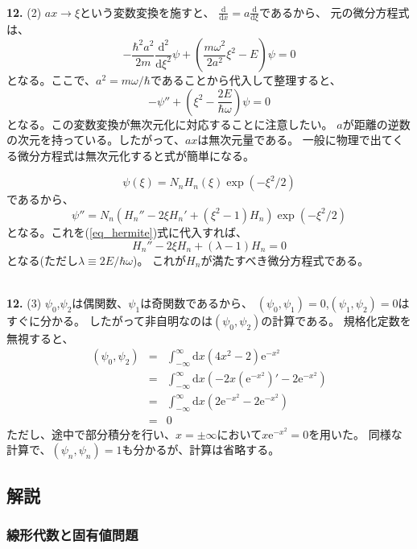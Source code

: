 \documentclass{jarticle}
\newcommand{\diff}{\mathrm d}
\newcommand{\ans}[2]{\noindent\\ {\bf \large #1.} (#2)}
\newcommand{\e}{\mathrm e}
\begin{document}
\ans{12}{2}
$ax \rightarrow \xi$という変数変換を施すと、
$\displaystyle \frac{\diff}{\diff x} = a \displaystyle\frac{\diff}{\diff \xi}$であるから、
元の微分方程式は、
$$
  -\frac{\hbar^2 a^2}{2m} \frac{\diff^2}{\diff \xi^2} \psi +
  \left(
  \frac{m \omega^2}{2a^2} \xi^2 -E
  \right) \psi = 0
$$
となる。ここで、$a^2 = m\omega/\hbar$であることから代入して整理すると、
\begin{equation}
  - \psi'' + (\xi^2 - \frac{2E}{\hbar \omega})\psi = 0 \label{eq_hermite}
\end{equation}
となる。この変数変換が無次元化に対応することに注意したい。
$a$が距離の逆数の次元を持っている。したがって、$ax$は無次元量である。
一般に物理で出てくる微分方程式は無次元化すると式が簡単になる。

$$
  \psi(\xi) = N_n H_n(\xi) \exp(-\xi^2/2)
$$
であるから、
$$
  \psi'' = N_n( H_n'' - 2\xi H_n' + (\xi^2-1) H_n) \exp(-\xi^2/2)
$$
となる。これを(\ref{eq_hermite})式に代入すれば、
$$
  H_n'' - 2 \xi H_n +(\lambda -1)H_n = 0
$$
となる(ただし$\lambda \equiv 2E/\hbar \omega$)。
これが$H_n$が満たすべき微分方程式である。

\ans{12}{3}
$\psi_0$,$\psi_2$は偶関数、$\psi_1$は奇関数であるから、
$(\psi_0,\psi_1)=0$,$(\psi_1,\psi_2)=0$はすぐに分かる。
したがって非自明なのは$(\psi_0,\psi_2)$の計算である。
規格化定数を無視すると、
\begin{eqnarray*}
  (\psi_0,\psi_2) &=& \int_{-\infty}^{\infty}\!\!\! \diff x (4x^2-2) \e^{-x^2} \\
  &=& \int_{-\infty}^{\infty}\!\!\! \diff x  \left(
  -2x (\e^{-x^2})' - 2 \e^{-x^2} \right) \\
  &=& \int_{-\infty}^{\infty}\!\!\! \diff x  \left( 2\e^{-x^2} - 2 \e^{-x^2} \right)\\
  &=& 0
\end{eqnarray*}
ただし、途中で部分積分を行い、$x=\pm \infty$において$x \e^{-x^2} = 0$を用いた。
同様な計算で、$(\psi_n,\psi_n) = 1$も分かるが、計算は省略する。

\subsection{解説}

\subsubsection{線形代数と固有値問題}
\end{document}

